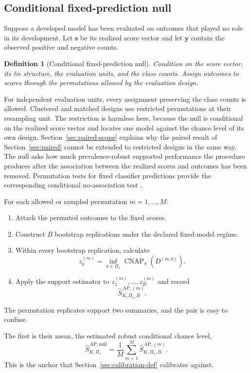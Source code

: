 \documentclass[11pt]{article}
\newcommand{\CNAP}{\operatorname{CNAP}}
\newcommand{\PSet}{\Pi_\star}
\newcommand{\SRobNullHat}{\widehat S_{K,\PSet}^{\,\mathrm{AP,null}}}
\newtheorem{definition}{Definition}
\theoremstyle{remark}
\begin{document}
\subsection{Conditional fixed-prediction null}

Suppose a developed model has been evaluated on outcomes that played no role in its development. Let $\mathbf{s}$ be its realized score vector and let $\mathbf{y}$ contain the observed positive and negative counts.

\begin{definition}[Conditional fixed-prediction null]
Condition on the score vector, its tie structure, the evaluation units, and the class counts. Assign outcomes to scores through the permutations allowed by the evaluation design.
\end{definition}

For independent evaluation units, every assignment preserving the class counts is allowed. Clustered and matched designs use restricted permutations at their resampling unit. The restriction is harmless here, because the null is conditional on the realized score vector and locates one model against the chance level of its own design. Section~\ref{sec:paired-scope} explains why the paired result of Section~\ref{sec:paired} cannot be extended to restricted designs in the same way. The null asks how much prevalence-robust supported performance the procedure produces after the association between the realized scores and outcomes has been removed. Permutation tests for fixed classifier predictions provide the corresponding conditional no-association test \cite{ojala2010permutation}.

For each allowed or sampled permutation $m=1,\ldots,M$:
\begin{enumerate}
\item Attach the permuted outcomes to the fixed scores.
\item Construct $B$ bootstrap replications under the declared fixed-model regime.
\item Within every bootstrap replication, calculate
\[
z_b^{(m)}
=
\inf_{\pi\in\PSet}
\CNAP_\pi(D^{(m,b)}).
\]
\item Apply the support estimator to $z_1^{(m)},\ldots,z_B^{(m)}$ and record
\[
\widehat S_{K,\PSet,B}^{\,\mathrm{AP},(m)}.
\]
\end{enumerate}

The permutation replicates support two summaries, and the pair is easy to confuse.

The first is their mean, the estimated robust conditional chance level,
\begin{equation}
\SRobNullHat
=
\frac{1}{M}
\sum_{m=1}^{M}
\widehat S_{K,\PSet,B}^{\,\mathrm{AP},(m)}.
\label{eq:robust-null}
\end{equation}
This is the anchor that Section~\ref{sec:calibration-def} calibrates against.
\end{document}
